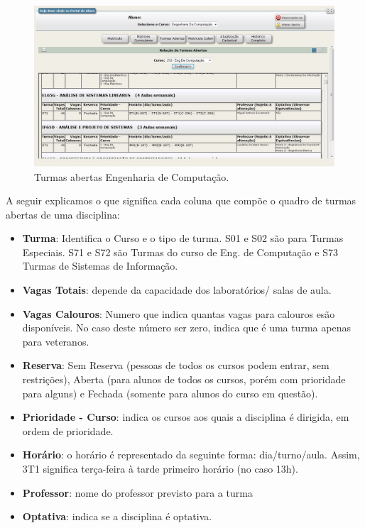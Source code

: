 \documentclass[a4paper,12pt,openany]{article}
\begin{document}
	\begin{figure}[ht!] \centering
		\includegraphics[scale=0.5]{turmasAbertas.jpg}
		\caption{Turmas abertas Engenharia de Computação.}
		\label{turmasAbertas}
	\end{figure}



\newpage
A seguir explicamos o que significa cada coluna que compõe o quadro de turmas abertas de uma disciplina:

\begin{itemize}
\item \textbf{Turma}: Identifica o Curso e o tipo de turma. S01 e S02 são para Turmas Especiais. S71 e S72 são Turmas do curso de Eng. de Computação e S73 Turmas de Sistemas de Informação.

\item \textbf{Vagas Totais}: depende da capacidade dos laboratórios/ salas de aula.

\item \textbf{Vagas Calouros}: Numero que indica quantas vagas para calouros esão disponíveis. No caso deste número ser zero, indica que é uma turma apenas para veteranos.

\item \textbf{Reserva}: Sem Reserva (pessoas de todos os cursos podem entrar, sem restrições), Aberta (para alunos de todos os cursos, porém com prioridade para alguns) e Fechada (somente para alunos do curso em questão).

\item \textbf{Prioridade - Curso}: indica os cursos aos quais a disciplina é dirigida, em ordem de prioridade.

\item \textbf{Horário}: o horário é representado da seguinte forma: dia/turno/aula. Assim, 3T1 significa terça-feira à tarde primeiro horário (no caso 13h).

\item \textbf{Professor}: nome do professor previsto para a turma

\item \textbf{Optativa}: indica se a disciplina é optativa.

\end{itemize}
\end{document}
